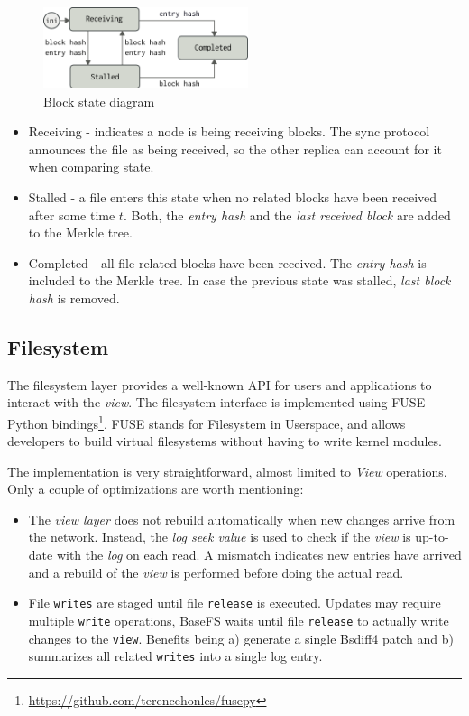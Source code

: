 \documentclass{sig-alternate}
\begin{document}
\begin{figure}
\centering
\includegraphics[width=170pt]{imgs/blockstate.png}
\caption{Block state diagram}
\label{fig:blockstate}
\end{figure}


\begin{itemize}
\item Receiving - indicates a node is being receiving blocks. The sync protocol announces the file as being received, so the other replica can account for it when comparing state.
\item Stalled - a file enters this state when no related blocks have been received after some time $t$. Both, the \textit{entry hash} and the \textit{last received block} are added to the Merkle tree.
\item Completed - all file related blocks have been received. The \textit{entry hash} is included to the Merkle tree. In case the previous state was stalled, \textit{last block hash} is removed.
\end{itemize}


\subsection{Filesystem}\label{filesystem}
The filesystem layer provides a well-known API for users and applications to interact with the \textit{view}. The filesystem interface is implemented using FUSE Python bindings\footnote{\url{https://github.com/terencehonles/fusepy}}. FUSE stands for Filesystem in Userspace, and allows developers to build virtual filesystems without having to write kernel modules.

The implementation is very straightforward, almost limited to \textit{View} operations. Only a couple of optimizations are worth mentioning:

\begin{itemize}
 \item The \textit{view layer} does not rebuild automatically when new changes arrive from the network. Instead, the \textit{log seek value} is used to check if the \textit{view} is up-to-date with the \textit{log} on each read. A mismatch indicates new entries have arrived and a rebuild of the \textit{view} is performed before doing the actual read.
 \item File \texttt{writes} are staged until file \texttt{release} is executed. Updates may require multiple \texttt{write} operations, BaseFS waits until file \texttt{release} to actually write changes to the \texttt{view}. Benefits being a) generate a single Bsdiff4 patch and b) summarizes all related \texttt{writes} into a single log entry.
\end{itemize}
\end{document}
